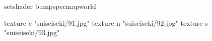 setshader bumpspecmapworld

    texture c "suiseiseki/91.jpg"
    texture n "suiseiseki/92.jpg"
    texture s "suiseiseki/93.jpg"
